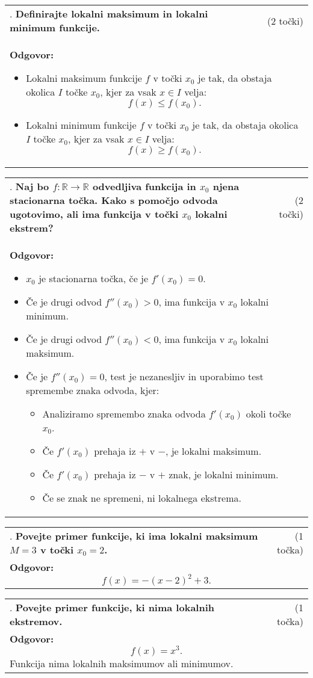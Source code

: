 \documentclass[12pt]{article}
\newcounter{vprasanje}[section]
\renewcommand{\thevprasanje}{\roman{vprasanje}}
\newcommand{\vprasanje}[2]{%
  \stepcounter{vprasanje}%
  \textbf{\thevprasanje}. \textbf{#1} & (#2) \\
}
\newcommand{\odgovor}[1]{%
  \multicolumn{2}{p{\dimexpr\textwidth-2\tabcolsep\relax}}{%
    \small \textbf{Odgovor:} #1%
  } \\[1em]%
}
\begin{document}
\begin{tabularx}{\textwidth}{X r}
\vprasanje{Definirajte lokalni maksimum in lokalni minimum funkcije.}{2 točki}
\odgovor{
\begin{itemize}
  \item Lokalni maksimum funkcije $f$ v točki $x_0$ je tak, da obstaja okolica $I$ točke $x_0$, kjer za vsak $x \in I$ velja:
  \[
  f(x) \leq f(x_0).
  \]
  \item Lokalni minimum funkcije $f$ v točki $x_0$ je tak, da obstaja okolica $I$ točke $x_0$, kjer za vsak $x \in I$ velja:
  \[
  f(x) \geq f(x_0).
  \]
\end{itemize}
}
\end{tabularx}

\begin{tabularx}{\textwidth}{X r}
\vprasanje{Naj bo $f: \mathbb{R} \rightarrow \mathbb{R}$ odvedljiva funkcija in $x_0$ njena stacionarna točka. Kako s pomočjo odvoda ugotovimo, ali ima funkcija v točki $x_0$ lokalni ekstrem?}{2 točki}
\odgovor{
\begin{itemize}
  \item $x_0$ je stacionarna točka, če je $f'(x_0) = 0$.
  \item Če je drugi odvod $f''(x_0) > 0$, ima funkcija v $x_0$ lokalni minimum.
  \item Če je drugi odvod $f''(x_0) < 0$, ima funkcija v $x_0$ lokalni maksimum.
  \item Če je $f''(x_0) = 0$, test je nezanesljiv in uporabimo test spremembe znaka odvoda, kjer:
  \begin{itemize}
  	\item Analiziramo spremembo znaka odvoda $f'(x_0)$ okoli točke $x_0$.
	\item Če $f'(x_0)$ prehaja iz $+$ v $-$, je lokalni maksimum.
	\item Če $f'(x_0)$ prehaja iz $-$ v $+$ znak, je lokalni minimum.
	\item Če se znak ne spremeni, ni lokalnega ekstrema.
  \end{itemize}
\end{itemize}
}
\end{tabularx}

\begin{tabularx}{\textwidth}{X r}
\vprasanje{Povejte primer funkcije, ki ima lokalni maksimum $M=3$ v točki $x_0=2$.}{1 točka}
\odgovor{
\[
f(x) = - (x-2)^2 + 3.
\]
}
\end{tabularx}

\begin{tabularx}{\textwidth}{X r}
\vprasanje{Povejte primer funkcije, ki nima lokalnih ekstremov.}{1 točka}
\odgovor{
\[
f(x) = x^3.
\]
Funkcija nima lokalnih maksimumov ali minimumov.
}
\end{tabularx}
\end{document}
